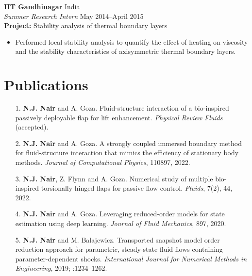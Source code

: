\documentclass[margin]{res}
\begin{document}
\begin{resume}
{\bf IIT Gandhinagar} \hfill India\\
{\it Summer Research Intern} \hfill   May 2014--April 2015\\
\textbf{Project:} Stability analysis of thermal boundary layers
\begin{itemize}
	\item Performed local stability analysis to quantify the effect of heating on viscosity and the stability characteristics of axisymmetric thermal boundary layers.%
\end{itemize}


\section{\large Publications}
 \begin{itemize}
 
  	\item[1.] \textbf{N.J. Nair} and A. Goza. Fluid-structure interaction of a bio-inspired passively deployable flap for lift enhancement. \textit{Physical Review Fluids} (accepted).

	\item[2.] \textbf{N.J. Nair} and A. Goza. A strongly coupled immersed boundary method for fluid-structure interaction that mimics the efficiency of stationary body methods. \textit{Journal of Computational Physics},  110897, 2022.
	
	\item[3.] \textbf{N.J. Nair}, Z. Flynn and A. Goza. Numerical study of multiple bio-inspired torsionally hinged flaps for passive flow control. \textit{Fluids}, 7(2), 44, 2022.
	
	\item[4.] \textbf{N.J. Nair} and A. Goza. Leveraging reduced-order models for state estimation using deep learning. \textit{Journal of Fluid Mechanics}, 897, 2020.
	
	\item[5.] \textbf{N.J. Nair} and M. Balajewicz. Transported snapshot model order reduction approach for parametric, steady-state fluid flows containing parameter-dependent shocks. \textit{International Journal for Numerical Methods in Engineering}, 2019; :1234–1262.
	
 \end{itemize}
 

\end{resume}
\end{document}
